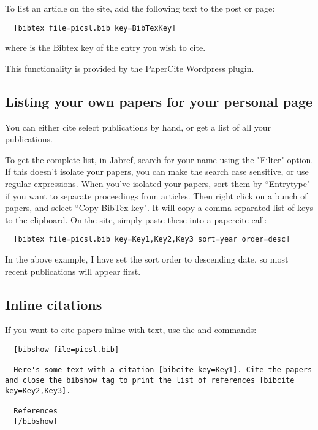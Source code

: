 \documentclass{InsightArticle}
\begin{document}
To list an article on the site, add the following text to the post or page:
\begin{lstlisting}
  [bibtex file=picsl.bib key=BibTexKey]
\end{lstlisting}
where  is the Bibtex key of the entry you wish to cite. 

This functionality is provided by the PaperCite Wordpress plugin. 

\subsection{Listing your own papers for your personal page}

You can either cite select publications by hand, or get a list of all your publications.

To get the complete list, in Jabref, search for your name using the "Filter" option. If this doesn't isolate your papers, you can make the search case sensitive, or use regular expressions. When you've isolated your papers, sort them by ``Entrytype" if you want to separate proceedings from articles. Then right click on a bunch of papers, and select ``Copy BibTex key". It will copy a comma separated list of keys to the clipboard. On the site, simply paste these into a papercite call:
\begin{lstlisting}
  [bibtex file=picsl.bib key=Key1,Key2,Key3 sort=year order=desc]
\end{lstlisting}

In the above example, I have set the sort order to descending date, so most recent publications will appear first.


\subsection{Inline citations}

If you want to cite papers inline with text, use the  and  commands:
\begin{lstlisting}
  [bibshow file=picsl.bib]
 
  Here's some text with a citation [bibcite key=Key1]. Cite the papers and close the bibshow tag to print the list of references [bibcite key=Key2,Key3].
  
  References
  [/bibshow]
\end{lstlisting}




\end{document}
